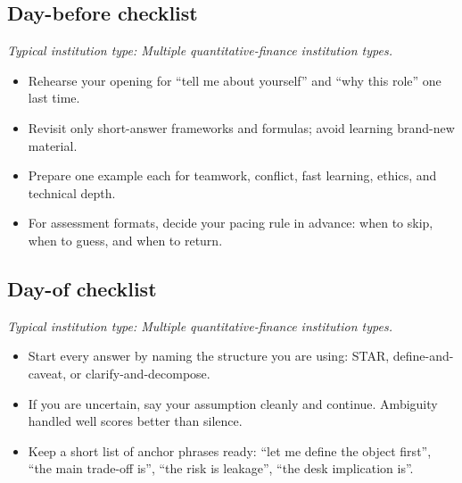 \documentclass[11pt,letterpaper,openany]{book}
\newcommand{\RoleProfile}[2]{%
  \subsection{#1}%
  \noindent\textit{Typical institution type: #2.}\par
}
\begin{document}
\RoleProfile{Day-before checklist}{Multiple quantitative-finance institution types}
\begin{itemize}
  \item Rehearse your opening for ``tell me about yourself'' and ``why this role'' one last time.
  \item Revisit only short-answer frameworks and formulas; avoid learning brand-new material.
  \item Prepare one example each for teamwork, conflict, fast learning, ethics, and technical depth.
  \item For assessment formats, decide your pacing rule in advance: when to skip, when to guess, and when to return.
\end{itemize}

\RoleProfile{Day-of checklist}{Multiple quantitative-finance institution types}
\begin{itemize}
  \item Start every answer by naming the structure you are using: STAR, define-and-caveat, or clarify-and-decompose.
  \item If you are uncertain, say your assumption cleanly and continue. Ambiguity handled well scores better than silence.
  \item Keep a short list of anchor phrases ready: ``let me define the object first'', ``the main trade-off is'', ``the risk is leakage'', ``the desk implication is''.
\end{itemize}
\end{document}
